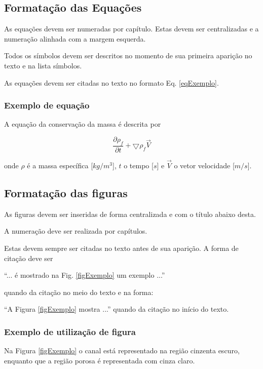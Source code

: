 \documentclass[a4paper,12pt,oneside]{article}
\numberwithin{equation}{section}
\begin{document}
\subsection{Formatação das Equações}

As equações devem ser numeradas por capítulo. Estas devem ser centralizadas e a numeração alinhada com a margem esquerda.


Todos os símbolos devem ser descritos no momento de sua primeira aparição no texto e na lista símbolos.


As equações devem ser citadas no texto no formato Eq. \ref{eqExemplo}.


\subsubsection{Exemplo de equação}

A equação da conservação da massa é descrita por

\begin{equation}
\frac{\partial\rho_{f}}{\partial t} + \bigtriangledown \rho_{f} \vec{V}
\label{eqExemplo}
\end{equation}

onde $\rho$ é a massa específica [$kg/m^{3}$], $t$ o tempo [$s$] e  $\vec{V}$ o vetor velocidade [$m/s$].

\subsection{Formatação das figuras}

As figuras devem ser inseridas de forma centralizada e com o título abaixo desta.

A numeração deve ser realizada por capítulos.

Estas devem sempre ser citadas no texto antes de sua aparição. A forma de citação deve ser 


“... é mostrado na Fig. \ref{figExemplo} um exemplo ...” 

quando da citação no meio do texto e na forma:

 “A Figura \ref{figExemplo} mostra ...” quando da citação no início do texto.
 
 
\subsubsection{Exemplo de utilização de figura}

Na Figura \ref{figExemplo} o canal está representado na região cinzenta escuro, enquanto que a região
porosa é representada com cinza claro.
\end{document}
